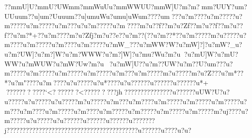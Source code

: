 {{{{{{{{{{{{{{{{{{{{{{{{{{{{{{{{{{{{{{{{{{{{{{{{{{{{{{{{{{{{{{{{{{{{{{{{{{{{{{{{{{{{{{{{{{{{{{{{{{{{{{{{{{{{{{{{{{{{{{{{{{{{{{{{{{{{{{{{{{{{{{{{{{{{{{{{{{{{{{{{{{{{{{{{{{{{{{{{{{{{{{{{{{{{{{{{{{{{{{{{{{{{{{{{{{{{{{{{{{{{{{{{{{{{{{{{{{{{{{{{{{{{{{{{{{{{{{{{{{{{{{{{{{{{{{{{{{{{{{{{{{{{{{{{{{{{{{{{{{{{{{{{{{{{{{{{{{{{{{{{{{{{{{{{{{{{{{{{{{{{{{{{{{{{{{{{{{{{{{{{{{{{{{{{{{{{{{{{{{{{{{{{{{{{{{{{{{{{{{{{{{{{{{{{{{{{{{{{{{{{{{{{{{{{{{{{{{{{{{{{{{{{{{{{{{{{{{{{{{{{{{{{{{{{{{{{{{{{{{{{{{{{{{{{{{{{{{{{{{{{{{{{{{{{{{{{{{{{{{{{{{{{{{{{{{{{{{{{{{{{{{{{{{{{{{{{{{{{{{{{{{{{{{{{{{{{{{{{{{{{{{{{{{{{{{{{{{{{{{{{{{{{{{{{{{{{{{{{{{{{{{{{{{{{{{{{{{{{{{{{{{{{{{{{{{{{{{{{{{{{{{{{{{{{{{{{{{{{{{{{{{{{{{{{{{{{{{{{{{{{{{{{{{{{{{{{{{{{{{{{{{{{{{{{{{{{{{{{{{{{{{{{{{{{{{{{{{{{{{{{{{{{{{{{{{{{{{{{{{{{{{{{{{{{{{{{{{{{{{{{{{{{{{{{{{{{{{{{{{{{{{{{{{{{{{{{{{{{{{{{{{{{{{{{{{{{{{{{{{{{{{{{{{{{{{{{{{{{{{{{{{{{{{{{{{{{{{{{{{{{{{{{{{{{{{{{{{{{{{{{{{{{{{{{{{{{{{{{{{{{{{{{{{{{{{{{{{{{{{{{{{{{{{{{{{{{{{{{{{{{{{{{{{{{{{{{{{{{{{{{{{{{{{{{{{{{{{{{{{{{{{{{{{{{{{{{{{{{{{{{{{{{{{{{{{{{{{{{{{{{{{{{{{{{{{{{{{{{{{{{{{{{{{{{{{{{{{{{{??m{mU]U?m{mU?UW{m{m    ?m{mWuUu?m{mWWUU?m{mW]U?{m?m ? {m{m?UUY?u{m?UUu{u{m??u]{u{m?Uuu{u{m??u]{u{muWu?{u{mu]uW{u{m????{u{m???{u?m????{u?m?????u?m?????u?m?????u?m???u?u?m?????u?m????m?u??f??m?u?Zf??m?u??f??m?u??f??u?m?*+??u?m????m?u?Zfj?m?u??e??u?m??(??u?m??*??u?m?????m?u?????u?m????u?m?????u?m????u?m?????u?mW_???u?mWW?W?u?mW]?]?u?mW?_u?u?m?UW]?u?m?]W?u?m?WWW?u?m?]W]?u?mu?Wu?m?u  ?u?mU]W?u?mU?WW?u?mWUW?u?mW?Uw?m?u ?u?mW]U??u?m??UW?u?m??U?u{m???u?m?????u?m?????u?m?????u?m?????u?m???u?m?????m?u?????m?u?Z???u?m*??*?u?m"????u?m????u?u?????u?u*????u?u?????}?u?????}?u?????}?u*+
??}?????????`<???????<?????????jh??}???????}?????}?u?????}?uUW?U?u?u?????u?u?????u?u?????m?u?????u?m???u?m????u?m?????u?m?????u?m?????u?m???u?m????u?m?????u?m????u?m?????u?m?????u?m?????u?m?????m?uj????u?m?????u?u?????u?u?????}?u?????}?u?????}?u?????}?}?j???}?}?????}?}???????}?????}?}?????}?}?????}?}?????}?u?????}?u????u?u?
}}}}}}}}}}}}}}}}}}}}}}}}}}}}}}}}}}}}}}}}}}}}}}}}}}}}}}}}}}}}}}}}}}}}}}}}}}}}}}}}}}}}}}}}}}}}}}}}}}}}}}}}}}}}}}}}}}}}}}}}}}}}}}}}}}}}}}}}}}}}}}}}}}}}}}}}}}}}}}}}}}}}}}}}}}}}}}}}}}}}}}}}}}}}}}}}}}}}}}}}}}}}}}}}}}}}}}}}}}}}}}}}}}}}}}}}}}}}}}}}}}}}}}}}}}}}}}}}}}}}}}}}}}}}}}}}}}}}}}}}}}}}}}}}}}}}}}}}}}}}}}}}}}}}}}}}}}}}}}}}}}}}}}}}}}}}}}}}}}}}}}}}}}}}}}}}}}}}}}}}}}}}}}}}}}}}}}}}}}}}}}}}}}}}}}}}}}}}}}}}}}}}}}}}}}}}}}}}}}}}}}}}}}}}}}}}}}}}}}}}}}}}}}}}}}}}}}}}}}}}}}}}}}}}}}}}}}}}}}}}}}}}}}}}}}}}}}}}}}}}}}}}}}}}}}}}}}}}}}}}}}}}}}}}}}}}}}}}}}}}}}}}}}}}}}}}}}}}}}}}}}}}}}}}}}}}}}}}}}}}}}}}}}}}}}}}}}}}}}}}}}}}}}}}}}}}}}}}}}}}}}}}}}}}}}}}}}}}}}}}}}}}}}}}}}}}}}}}}}}}}}}}}}}}}}}}}}}}}}}}}}}}}}}}}}}}}}}}}}}}}}}}}}}}}}}}}}}}}}}}}}}}}}}}}}}}}}}}}}}}}}}}}}}}}}}}}}}}}}}}}}}}}}}}}}}}}}}}}}}}}}}}}}}}}}}}}}}}}}}}}}}}}}}}}}}}}}}}}}}}}}}}}}}}}}}}}}}}}}}}}}}}}}}}}}}}}}}}}}}}}}}}}}}}}}}}}}}}}}}}}}}}}}}}}}}}}}}}}}}}}}}}}}}}}}}}}}}}}}}}}}}}}}}}}}}}}}}}}}}}}}}}}}}}}}}}}}}}}}}}}}}}}}}}}}}}}}}}}}}}}}}}}}}}}}}}}}}}}}}}}}}}}}}}}}}}}}}}}}}}}}}}}}}}}}}}}}}}}}}}}}}}}}}}}}}}}}}}}}}}}}}}}}}}}}}}}}}}}}}}}}}}}}}}}}}}}}}}}}}

